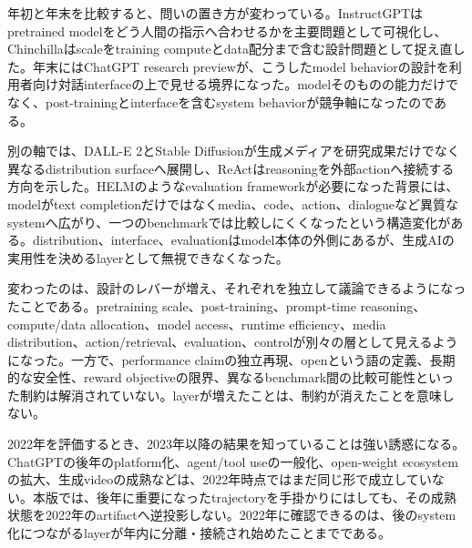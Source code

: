 
年初と年末を比較すると、問いの置き方が変わっている。InstructGPTはpretrained modelをどう人間の指示へ合わせるかを主要問題として可視化し、Chinchillaはscaleをtraining computeとdata配分まで含む設計問題として捉え直した。年末にはChatGPT research previewが、こうしたmodel behaviorの設計を利用者向け対話interfaceの上で見せる境界になった。modelそのものの能力だけでなく、post-trainingとinterfaceを含むsystem behaviorが競争軸になったのである。\autocite{src-6ffa5c4e64ca,src-87477ad8b476,src-bc1a61aec959,src-e58f1e9c8754,src-e8da8e8f02bc}


別の軸では、DALL-E 2とStable Diffusionが生成メディアを研究成果だけでなく異なるdistribution surfaceへ展開し、ReActはreasoningを外部actionへ接続する方向を示した。HELMのようなevaluation frameworkが必要になった背景には、modelがtext completionだけではなくmedia、code、action、dialogueなど異質なsystemへ広がり、一つのbenchmarkでは比較しにくくなったという構造変化がある。distribution、interface、evaluationはmodel本体の外側にあるが、生成AIの実用性を決めるlayerとして無視できなくなった。\autocite{src-16a1a1dc486e,src-1e362767e63c,src-26aadbc0393f,src-27297a80fac0,src-2832ee43ab8f,src-2c38d2f354fa,src-811e1008822e,src-86ce6205a4ed,src-929080260e16}


変わったのは、設計のレバーが増え、それぞれを独立して議論できるようになったことである。pretraining scale、post-training、prompt-time reasoning、compute/data allocation、model access、runtime efficiency、media distribution、action/retrieval、evaluation、controlが別々の層として見えるようになった。一方で、performance claimの独立再現、openという語の定義、長期的な安全性、reward objectiveの限界、異なるbenchmark間の比較可能性といった制約は解消されていない。layerが増えたことは、制約が消えたことを意味しない。\autocite{src-1e362767e63c,src-26aadbc0393f,src-2832ee43ab8f,src-6ffa5c4e64ca,src-87477ad8b476,src-e58f1e9c8754,src-e8da8e8f02bc}


2022年を評価するとき、2023年以降の結果を知っていることは強い誘惑になる。ChatGPTの後年のplatform化、agent/tool useの一般化、open-weight ecosystemの拡大、生成videoの成熟などは、2022年時点ではまだ同じ形で成立していない。本版では、後年に重要になったtrajectoryを手掛かりにはしても、その成熟状態を2022年のartifactへ逆投影しない。2022年に確認できるのは、後のsystem化につながるlayerが年内に分離・接続され始めたことまでである。\autocite{src-26aadbc0393f,src-2832ee43ab8f,src-811e1008822e,src-bc1a61aec959}


